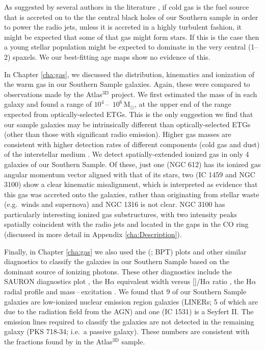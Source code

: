 As suggested by several authors in the literature \citep[e.g.][]{Collin1999, Diamond-Stanic2012, LaMassa2013}, if cold gas is the fuel source that is accreted on to the the central black holes of our Southern sample in order to power the radio jets, unless it is accreted in a highly turbulent fashion, it might be expected that some of that gas might form stars. If this is the case then a young stellar population might be expected to dominate in the very central (1--2) spaxels. We our best-fitting age maps show no evidence of this. 

In Chapter \ref{cha:gas}, we discussed the distribution, kinematics and ionization of the warm gas in our Southern Sample galaxies. Again, these were compared to observations made by the Atlas$^\text{3D}$ project. We first estimated the mass of  in each galaxy and found a range of $10^4$\,--\, $10^6\,\mathrm{M_\odot}$, at the upper end of the range expected from optically-selected ETGs. This is the only suggestion we find that our sample galaxies may be intrinsically different than optically-selected ETGs (other than those with significant radio emission). Higher gas masses are consistent with higher detection rates of different components (cold gas and dust) of the interstellar medium \citep[ISM; e.g.][]{DeRuiter2002, Leon2003, VerdoesKleijn2005}. We detect spatially-extended ionized gas in only 4 galaxies of our Southern Sample. Of these, just one (NGC 612) has its ionized gas angular momentum vector aligned with that of its stars, two (IC 1459 and NGC 3100) show a clear kinematic misalignment, which is interpreted as evidence that this gas was accreted onto the galaxies, rather than originating from stellar waste (e.g.\ winds and supernova) and NGC 1316 is not clear. NGC 3100 has particularly interesting ionized gas substructures, with two intensity peaks spatially coincident with the radio jets and located in the gaps in the CO ring (discussed in more detail in Appendix \ref{cha:Description}). 

Finally, in Chapter \ref{cha:gas} we also used the \citeauthor{Baldwin1981} (\citeyear{Baldwin1981}; BPT) plots and other similar diagnostics to classify the galaxies in our Southern Sample based on the dominant source of ionizing photons. These other diagnostics include the SAURON diagnostics plot \citep{Sarzi2010}, the H$\alpha$ equivalent width versus []/H$\alpha$ ratio \citep[WHaN2;][]{CidFernandes2011}, the H$\alpha$ radial profile and mass\,--\,excitation \citep[MEx;][]{Nyland2016}. We found that 9 of our Southern Sample galaxies are low-ionized nuclear emission region galaxies (LINERs; 5 of which are due to the radiation field from the AGN) and one (IC 1531) is a Seyfert II. The emission lines required to classify the galaxies are not detected in the remaining galaxy (PKS 718-34; i.e.\ a passive galaxy). These numbers are consistent with the fractions found by \citet{Nyland2016} in the Atlas$^\text{3D}$ sample.

